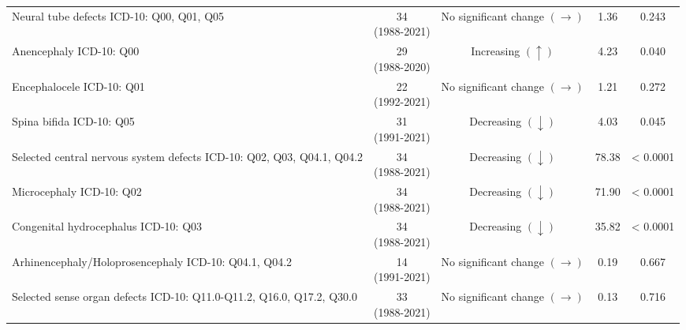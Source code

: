 \documentclass[
]{krantz}
\begin{document}
\begin{longtable}[t]{>{\raggedright\arraybackslash}p{4cm}cccc}
\endfoot
\bottomrule
\endlastfoot
Neural tube defects\newline  \tiny{ ICD-10: Q00, Q01, Q05} & \makecell[c]{34\\ \tiny{(1988-2021)}} & \makecell[c]{No significant \\ change $\left(\rightarrow \right)$} & 1.36 & 0.243\\
Anencephaly\newline  \tiny{ ICD-10: Q00} & \makecell[c]{29\\ \tiny{(1988-2020)}} & Increasing $\left(\uparrow \right)$ & 4.23 & 0.040\\
Encephalocele\newline  \tiny{ ICD-10: Q01} & \makecell[c]{22\\ \tiny{(1992-2021)}} & \makecell[c]{No significant \\ change $\left(\rightarrow \right)$} & 1.21 & 0.272\\
Spina bifida\newline  \tiny{ ICD-10: Q05} & \makecell[c]{31\\ \tiny{(1991-2021)}} & Decreasing $\left(\downarrow \right)$ & 4.03 & 0.045\\
Selected central nervous system defects\newline  \tiny{ ICD-10: Q02, Q03, Q04.1, Q04.2} & \makecell[c]{34\\ \tiny{(1988-2021)}} & Decreasing $\left(\downarrow \right)$ & 78.38 & < 0.0001\\
\addlinespace
Microcephaly\newline  \tiny{ ICD-10: Q02} & \makecell[c]{34\\ \tiny{(1988-2021)}} & Decreasing $\left(\downarrow \right)$ & 71.90 & < 0.0001\\
Congenital hydrocephalus\newline  \tiny{ ICD-10: Q03} & \makecell[c]{34\\ \tiny{(1988-2021)}} & Decreasing $\left(\downarrow \right)$ & 35.82 & < 0.0001\\
Arhinencephaly/Holoprosencephaly\newline  \tiny{ ICD-10: Q04.1, Q04.2} & \makecell[c]{14\\ \tiny{(1991-2021)}} & \makecell[c]{No significant \\ change $\left(\rightarrow \right)$} & 0.19 & 0.667\\
Selected sense organ defects\newline  \tiny{ ICD-10: Q11.0-Q11.2, Q16.0, Q17.2, Q30.0} & \makecell[c]{33\\ \tiny{(1988-2021)}} & \makecell[c]{No significant \\ change $\left(\rightarrow \right)$} & 0.13 & 0.716\\

\end{longtable}
\end{document}
